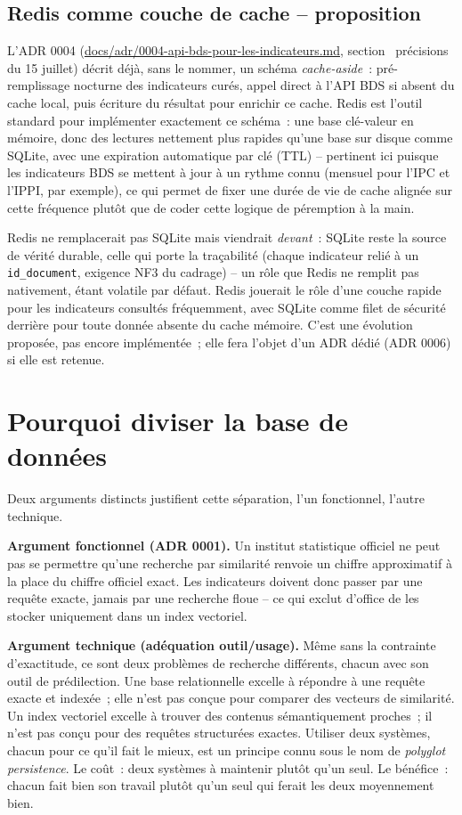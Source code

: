 \documentclass[11pt,a4paper]{article}
\begin{document}
\subsection{Redis comme couche de cache -- proposition}
L'ADR 0004 (\url{docs/adr/0004-api-bds-pour-les-indicateurs.md}, section \guillemotleft~pr\'ecisions du 15 juillet\guillemotright) d\'ecrit d\'ej\`a, sans le nommer, un sch\'ema \emph{cache-aside}~: pr\'e-remplissage nocturne des indicateurs cur\'es, appel direct \`a l'API BDS si absent du cache local, puis \'ecriture du r\'esultat pour enrichir ce cache. Redis est l'outil standard pour impl\'ementer exactement ce sch\'ema~: une base cl\'e-valeur en m\'emoire, donc des lectures nettement plus rapides qu'une base sur disque comme SQLite, avec une expiration automatique par cl\'e (TTL) -- pertinent ici puisque les indicateurs BDS se mettent \`a jour \`a un rythme connu (mensuel pour l'IPC et l'IPPI, par exemple), ce qui permet de fixer une dur\'ee de vie de cache align\'ee sur cette fr\'equence plut\^ot que de coder cette logique de p\'eremption \`a la main.

Redis ne remplacerait pas SQLite mais viendrait \emph{devant}~: SQLite reste la source de v\'erit\'e durable, celle qui porte la tra\c{c}abilit\'e (chaque indicateur reli\'e \`a un \texttt{id\_document}, exigence NF3 du cadrage) -- un r\^ole que Redis ne remplit pas nativement, \'etant volatile par d\'efaut. Redis jouerait le r\^ole d'une couche rapide pour les indicateurs consult\'es fr\'equemment, avec SQLite comme filet de s\'ecurit\'e derri\`ere pour toute donn\'ee absente du cache m\'emoire. C'est une \'evolution propos\'ee, pas encore impl\'ement\'ee~; elle fera l'objet d'un ADR d\'edi\'e (ADR 0006) si elle est retenue.

\section{Pourquoi diviser la base de donn\'ees}
Deux arguments distincts justifient cette s\'eparation, l'un fonctionnel, l'autre technique.

\textbf{Argument fonctionnel (ADR 0001).} Un institut statistique officiel ne peut pas se permettre qu'une recherche par similarit\'e renvoie un chiffre approximatif \`a la place du chiffre officiel exact. Les indicateurs doivent donc passer par une requ\^ete exacte, jamais par une recherche floue -- ce qui exclut d'office de les stocker uniquement dans un index vectoriel.

\textbf{Argument technique (ad\'equation outil/usage).} M\^eme sans la contrainte d'exactitude, ce sont deux probl\`emes de recherche diff\'erents, chacun avec son outil de pr\'edilection. Une base relationnelle excelle \`a r\'epondre \`a une requ\^ete exacte et index\'ee~; elle n'est pas con\c{c}ue pour comparer des vecteurs de similarit\'e. Un index vectoriel excelle \`a trouver des contenus s\'emantiquement proches~; il n'est pas con\c{c}u pour des requ\^etes structur\'ees exactes. Utiliser deux syst\`emes, chacun pour ce qu'il fait le mieux, est un principe connu sous le nom de \emph{polyglot persistence}. Le co\^ut~: deux syst\`emes \`a maintenir plut\^ot qu'un seul. Le b\'en\'efice~: chacun fait bien son travail plut\^ot qu'un seul qui ferait les deux moyennement bien.
\end{document}
